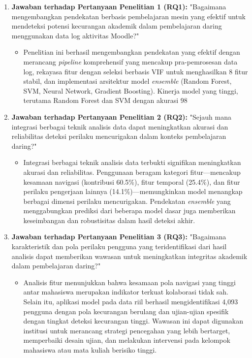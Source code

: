 \begin{enumerate}
\item \textbf{Jawaban terhadap Pertanyaan Penelitian 1 (RQ1):} "Bagaimana mengembangkan pendekatan berbasis pembelajaran mesin yang efektif untuk mendeteksi potensi kecurangan akademik dalam pembelajaran daring menggunakan data log aktivitas Moodle?"
\begin{itemize}
\item Penelitian ini berhasil mengembangkan pendekatan yang efektif dengan merancang \textit{pipeline} komprehensif yang mencakup pra-pemrosesan data log, rekayasa fitur dengan seleksi berbasis VIF untuk menghasilkan 8 fitur stabil, dan implementasi arsitektur model \textit{ensemble} (Random Forest, SVM, Neural Network, Gradient Boosting). Kinerja model yang tinggi, terutama Random Forest dan SVM dengan akurasi 98%
\end{itemize}

\item \textbf{Jawaban terhadap Pertanyaan Penelitian 2 (RQ2):} "Sejauh mana integrasi berbagai teknik analisis data dapat meningkatkan akurasi dan reliabilitas deteksi perilaku mencurigakan dalam konteks pembelajaran daring?"
\begin{itemize}
    \item Integrasi berbagai teknik analisis data terbukti signifikan meningkatkan akurasi dan reliabilitas. Penggunaan beragam kategori fitur—mencakup kesamaan navigasi (kontribusi 60.5\%), fitur temporal (25.4\%), dan fitur perilaku pengerjaan lainnya (14.1\%)—memungkinkan model menangkap berbagai dimensi perilaku mencurigakan. Pendekatan \textit{ensemble} yang menggabungkan prediksi dari beberapa model dasar juga memberikan keseimbangan dan robustisitas dalam hasil deteksi akhir.
\end{itemize}

\item \textbf{Jawaban terhadap Pertanyaan Penelitian 3 (RQ3):} "Bagaimana karakteristik dan pola perilaku pengguna yang teridentifikasi dari hasil analisis dapat memberikan wawasan untuk meningkatkan integritas akademik dalam pembelajaran daring?"
\begin{itemize}
    \item Analisis fitur menunjukkan bahwa kesamaan pola navigasi yang tinggi antar mahasiswa merupakan indikator terkuat kolaborasi tidak sah. Selain itu, aplikasi model pada data riil berhasil mengidentifikasi 4,093 pengguna dengan pola kecurangan berulang dan ujian-ujian spesifik dengan tingkat deteksi kecurangan tinggi. Wawasan ini dapat digunakan institusi untuk merancang strategi pencegahan yang lebih bertarget, memperbaiki desain ujian, dan melakukan intervensi pada kelompok mahasiswa atau mata kuliah berisiko tinggi.
\end{itemize}
\end{enumerate}

